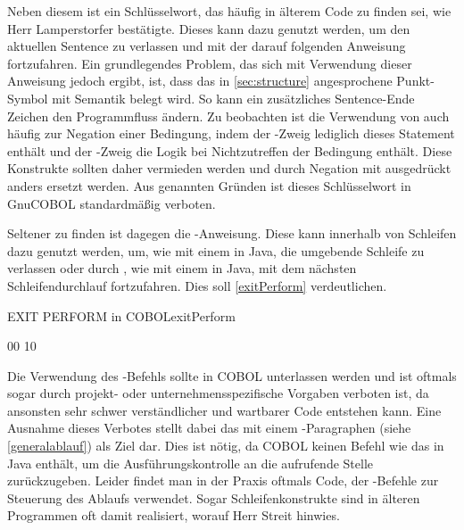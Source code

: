 Neben diesem ist  ein Schlüsselwort, das häufig in älterem Code zu finden sei, wie Herr Lamperstorfer bestätigte. Dieses kann dazu genutzt werden, um den aktuellen Sentence zu verlassen und mit der darauf folgenden Anweisung fortzufahren. Ein grundlegendes Problem, das sich mit Verwendung dieser Anweisung jedoch ergibt, ist, dass das in \autoref{sec:structure} angesprochene Punkt-Symbol mit Semantik belegt wird. So kann ein zusätzliches Sentence-Ende Zeichen den Programmfluss ändern. Zu beobachten ist die Verwendung von  auch häufig zur Negation einer Bedingung, indem der -Zweig lediglich dieses Statement enthält und der -Zweig die Logik bei Nichtzutreffen der Bedingung enthält. Diese Konstrukte sollten daher vermieden werden und durch Negation mit  ausgedrückt \bzw anders ersetzt werden. Aus genannten Gründen ist dieses Schlüsselwort in GnuCOBOL standardmäßig verboten.

Seltener zu finden ist dagegen die -Anweisung. Diese kann innerhalb von Schleifen dazu genutzt werden, um, wie mit einem  in Java, die umgebende Schleife zu verlassen oder durch , wie mit einem  in Java, mit dem nächsten Schleifendurchlauf fortzufahren. Dies soll \autoref{exitPerform} verdeutlichen.

\begin{codeWithCaption}{EXIT PERFORM in COBOL}{exitPerform}
 \cFollow
\begin{shellwindow}
00
10
\end{shellwindow}
\end{codeWithCaption}

Die Verwendung des -Befehls sollte in COBOL unterlassen werden und ist oftmals sogar durch projekt- oder unternehmensspezifische Vorgaben verboten ist, da ansonsten sehr schwer verständlicher und wartbarer Code entstehen kann. Eine Ausnahme dieses Verbotes stellt dabei das  mit einem -Paragraphen (siehe \autoref{generalablauf}) als Ziel dar. Dies ist nötig, da COBOL keinen Befehl wie das  in Java enthält, um die Ausführungskontrolle an die aufrufende Stelle zurückzugeben. Leider findet man in der Praxis oftmals Code, der -Befehle zur Steuerung des Ablaufs verwendet. Sogar Schleifenkonstrukte sind in älteren Programmen oft damit realisiert, worauf Herr Streit hinwies. 